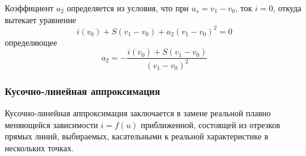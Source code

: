 Коэффициент $a_2$ определяется из условия, что при $u_s=v_1-v_0$, ток $i=0$, откуда вытекает уравнение
\begin{equation*}
i(v_0)+S(v_1-v_0)+a_2(v_1-v_0)^2=0
\end{equation*}
определяющее
\begin{equation*}
a_2=-\frac{i(v_0)+S(v_1-v_0)}{(v_1-v_0)^2}
\end{equation*}
\subsubsection{Кусочно-линейная аппроксимация}
Кусочно-линейная аппроксимация заключается в замене реальной плавно меняющейся зависимости $i=f(u)$ приближенной, состоящей из отрезков прямых линий, выбираемых, касательными к реальной характеристике в нескольких точках.

